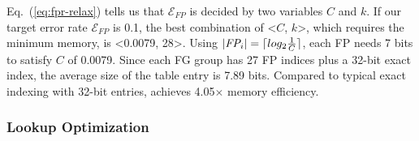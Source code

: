 Eq.~(\ref{eq:fpr-relax}) tells us that $\mathcal{E}_{FP}$ is decided by
two variables $C$ and $k$. 
If our target error rate $\mathcal{E}_{FP}$ is 0.1, 
the best combination of <$C$, $k$>,
which requires the minimum memory,
is <0.0079, 28>. Using $|\textit{FP$_{i}$}| = \lceil log_{2}\frac{1}{C}\rceil$,
each FP needs 7 bits to satisfy $C$ of 0.0079.
Since each FG group has 27 FP indices plus a 32-bit exact index,
the average size of the table entry is 7.89 bits.
Compared to typical exact indexing with 32-bit entries, \ours{} achieves 4.05$\times$ memory efficiency.

\subsubsection{Lookup Optimization}
\label{sec:design:bf-lookup}

